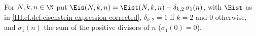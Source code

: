 For $N,k,n\in\N$ put $\Eis(N,k,n)=\Eist(N,k,n)-\delta_{k,2}\,\sigma_1(n)$, with $\Eist$ as in \cref{III.ef.def:eisenstein-expression-corrected},
$\delta_{k,2}=1$ if $k=2$ and $0$ otherwise, and $\sigma_1(n)$ the sum of the positive divisors of $n$ ($\sigma_1(0)=0$).
